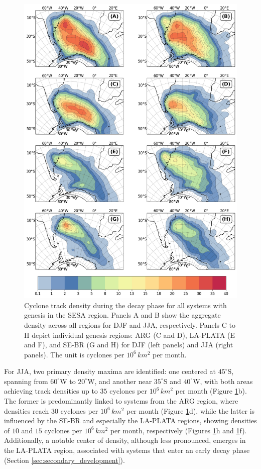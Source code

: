 \begin{figure}[!htbp]
\centering
\includegraphics[width=\textwidth]{figs_4/density_map_decay.png}
\caption[Track Density - Decay Phase]{Cyclone track density during the decay phase for all systems with genesis in the SESA region. Panels A and B show the aggregate density across all regions for DJF and JJA, respectively. Panels C to H depict individual genesis regions: ARG (C and D), LA-PLATA (E and F), and SE-BR (G and H) for DJF (left panels) and JJA (right panels). The unit is cyclones per \(10^6 \, km^2\) per month.}
\label{fig:density_map_decay}
\end{figure}

For JJA, two primary density maxima are identified: one centered at \(45^\circ\)S, spanning from \(60^\circ\)W to \(20^\circ\)W, and another near \(35^\circ\)S and \(40^\circ\)W, with both areas achieving track densities up to \(35\) cyclones per \(10^6 \, km^2\) per month (Figure \ref{fig:density_map_decay}b). The former is predominantly linked to systems from the ARG region, where densities reach \(30\) cyclones per \(10^6 \, km^2\) per month (Figure \ref{fig:density_map_decay}d), while the latter is influenced by the SE-BR and especially the LA-PLATA regions, showing densities of \(10\) and \(15\) cyclones per \(10^6 \, km^2\) per month, respectively (Figures \ref{fig:density_map_decay}h and \ref{fig:density_map_decay}f). Additionally, a notable center of density, although less pronounced, emerges in the LA-PLATA region, associated with systems that enter an early decay phase (Section \ref{sec:secondary_development}). 

